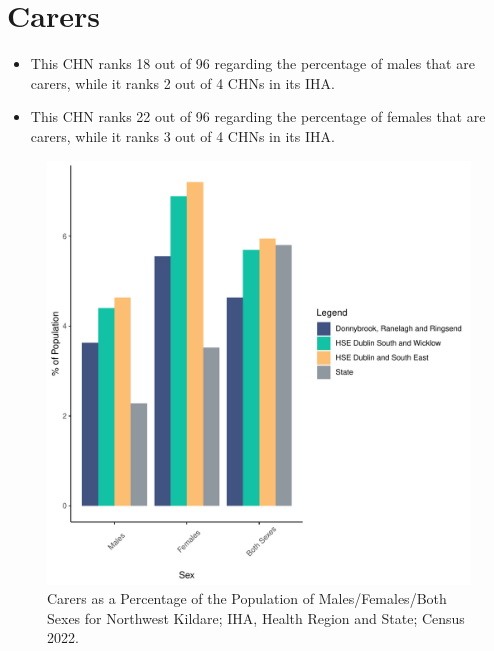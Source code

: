 \documentclass{article}
\begin{document}
\section{Carers}\label{sect:Carers}
\begin{itemize}
\item This CHN ranks  18 out of 96 regarding the percentage of males that are carers, while it ranks   2 out of 4 CHNs in its IHA.
\item This CHN ranks  22 out of 96 regarding the percentage of females that are carers, while it ranks   3 out of 4 CHNs in its IHA.
\end{itemize}
\begin{figure}[H]
	\centering
	\includegraphics[width = 150mm]{../figures/CareED.pdf}
	\caption{Carers as a Percentage of the Population of Males/Females/Both Sexes for Northwest Kildare; IHA, Health Region and State; Census 2022.}
	\label{fig:2ae19629-1a6a-13a3-e055-000000000001}
	\end{figure}
\end{document}
